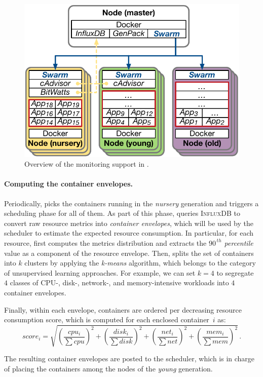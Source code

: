 \begin{figure}[t]
\centering
\includegraphics[width=.7\linewidth]{figures/monitoring}
\caption{Overview of the monitoring support in \GP{}.}
\label{fig:monitoring}
\end{figure}

\paragraph{Computing the container envelopes.}

Periodically, \GP{} picks the containers running in the \emph{nursery} generation and triggers a scheduling phase for all of them.
As part of this phase, \GP{} queries \textsc{InfluxDB} to convert raw resource metrics into \emph{container envelopes}, which will be used by the scheduler to estimate the expected resource consumption.
In particular, for each resource, \GP{} first computes the metrics distribution and extracts the \emph{$90^{\,th}$ percentile} value as a component of the resource envelope.
Then, \GP{} splits the set of containers into $k$ clusters by applying the \emph{k-means} algorithm, which belongs to the category of unsupervised learning approaches.
For example, we can set $k=4$ to segregate $4$ classes of CPU-, disk-, network-, and memory-intensive workloads into $4$ container envelopes.

Finally, within each envelope, containers are ordered per decreasing resource consumption score, which is computed for each enclosed container~$i$ as:
\small
\[score_i=\sqrt{(\frac{cpu_i}{\sum{cpu}})^2+(\frac{disk_i}{\sum{disk}})^2+(\frac{net_i}{\sum{net}})^2+(\frac{mem_i}{\sum{mem}})^2}\,.\]
\normalsize

The resulting container envelopes are posted to the \GP{} scheduler, which is in charge of placing the containers among the nodes of the \emph{young} generation.

